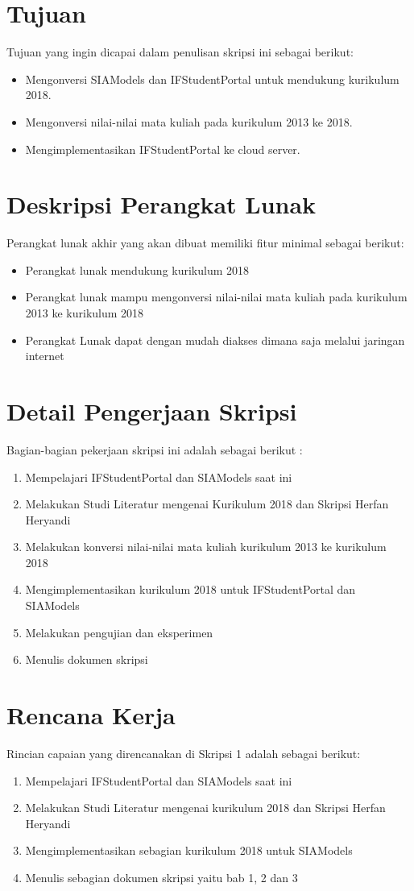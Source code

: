 \documentclass[a4paper,twoside]{article}
\begin{document}
\section{Tujuan}
Tujuan yang ingin dicapai dalam penulisan skripsi ini sebagai berikut:
\begin{itemize}
	\item Mengonversi SIAModels dan IFStudentPortal untuk mendukung kurikulum 2018.
	\item Mengonversi nilai-nilai mata kuliah pada kurikulum 2013 ke 2018.
	\item Mengimplementasikan IFStudentPortal ke cloud server.
\end{itemize}

\section{Deskripsi Perangkat Lunak}
Perangkat lunak akhir yang akan dibuat memiliki fitur minimal sebagai berikut:
\begin{itemize}
	\item Perangkat lunak mendukung kurikulum 2018
	\item Perangkat lunak mampu mengonversi nilai-nilai mata kuliah pada kurikulum 2013 ke kurikulum 2018
	\item Perangkat Lunak dapat dengan mudah diakses dimana saja melalui jaringan internet
\end{itemize}

\section{Detail Pengerjaan Skripsi}
Bagian-bagian pekerjaan skripsi ini adalah sebagai berikut :
	\begin{enumerate}
		\item Mempelajari IFStudentPortal dan SIAModels saat ini
		\item Melakukan Studi Literatur mengenai Kurikulum 2018 dan Skripsi Herfan Heryandi
		\item Melakukan konversi nilai-nilai mata kuliah kurikulum 2013 ke kurikulum 2018 
		\item Mengimplementasikan kurikulum 2018 untuk IFStudentPortal dan SIAModels
		\item Melakukan pengujian dan eksperimen
		\item Menulis dokumen skripsi
	\end{enumerate}

\section{Rencana Kerja}
Rincian capaian yang direncanakan di Skripsi 1 adalah sebagai berikut:
\begin{enumerate}
\item Mempelajari IFStudentPortal dan SIAModels saat ini
\item Melakukan Studi Literatur mengenai kurikulum 2018 dan Skripsi Herfan Heryandi
\item Mengimplementasikan sebagian kurikulum 2018 untuk SIAModels
\item Menulis sebagian dokumen skripsi yaitu bab 1, 2 dan 3
\end{enumerate}
\end{document}
